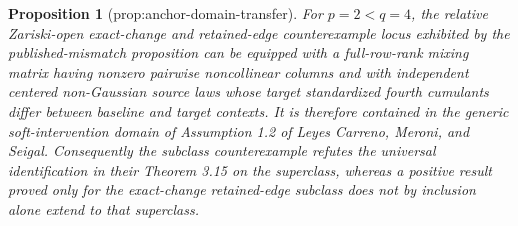 \documentclass{article}
\newtheorem{proposition}{Proposition}
\begin{document}
\begin{proposition}[prop:anchor-domain-transfer]\label{prop:anchor-domain-transfer}
For \(p=2<q=4\), the relative Zariski-open exact-change and retained-edge counterexample locus exhibited by the published-mismatch proposition can be equipped with a full-row-rank mixing matrix having nonzero pairwise noncollinear columns and with independent centered non-Gaussian source laws whose target standardized fourth cumulants differ between baseline and target contexts.  It is therefore contained in the generic soft-intervention domain of Assumption 1.2 of Leyes Carreno, Meroni, and Seigal.  Consequently the subclass counterexample refutes the universal identification in their Theorem 3.15 on the superclass, whereas a positive result proved only for the exact-change retained-edge subclass does not by inclusion alone extend to that superclass.
\end{proposition}
\end{document}
